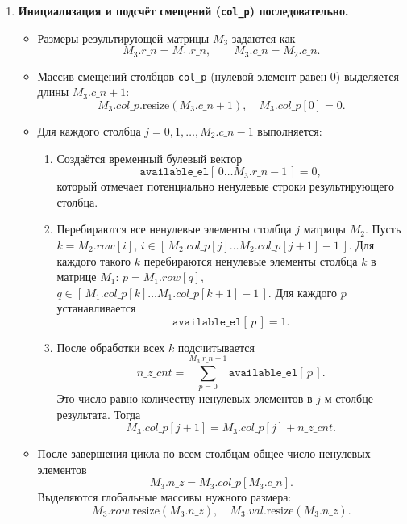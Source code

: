 \documentclass[12pt]{article}
\begin{document}
\begin{enumerate}
    \item \textbf{Инициализация и подсчёт смещений (\texttt{col\_p}) последовательно.}
    \begin{itemize}
        \item Размеры результирующей матрицы \(M_3\) задаются как
        \[
            M_3.r\_n = M_1.r\_n,\qquad
            M_3.c\_n = M_2.c\_n.
        \]
        \item Массив смещений столбцов \texttt{col\_p} (нулевой элемент равен 0) выделяется длины \(M_3.c\_n + 1\):
        \[
            M_3.col\_p.\text{resize}(M_3.c\_n + 1),\quad M_3.col\_p[0] = 0.
        \]
        \item Для каждого столбца \(j = 0,1,\dots,M_2.c\_n - 1\) выполняется:
        \begin{enumerate}
            \item Создаётся временный булевый вектор
            \[
                \texttt{available\_el}[\,0 \dots M_3.r\_n-1\,] = 0,
            \]
            который отмечает потенциально ненулевые строки результирующего столбца.
            \item Перебираются все ненулевые элементы столбца \(j\) матрицы \(M_2\). Пусть \(k = M_2.row[i]\), \(i \in [\,M_2.col\_p[j] \dots M_2.col\_p[j+1] - 1\,]\). Для каждого такого \(k\) перебираются ненулевые элементы столбца \(k\) в матрице \(M_1\): \(p = M_1.row[q]\),  \(q \in [\,M_1.col\_p[k] \dots M_1.col\_p[k+1] - 1\,]\). Для каждого \(p\) устанавливается
            \[
                \texttt{available\_el}[\,p\,] = 1.
            \]
            \item После обработки всех \(k\) подсчитывается
            \[
                n\_z\_cnt = \sum_{p=0}^{M_3.r\_n - 1} \texttt{available\_el}[\,p\,].
            \]
            Это число равно количеству ненулевых элементов в \(j\)-м столбце результата. Тогда
            \[
                M_3.col\_p[j+1] = M_3.col\_p[j] + n\_z\_cnt.
            \]
        \end{enumerate}
        \item После завершения цикла по всем столбцам общее число ненулевых элементов
        \[
            M_3.n\_z = M_3.col\_p[M_3.c\_n].
        \]
        Выделяются глобальные массивы нужного размера:
        \[
            M_3.row.\text{resize}(M_3.n\_z), \quad
            M_3.val.\text{resize}(M_3.n\_z).
        \]
    \end{itemize}


\end{enumerate}
\end{document}
